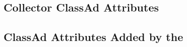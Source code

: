 \subsection*{\label{sec:Collector-ClassAd-Attributes}Collector ClassAd Attributes}


\subsection*{\label{sec:Collector-Added-Attributes}ClassAd Attributes Added by the }

